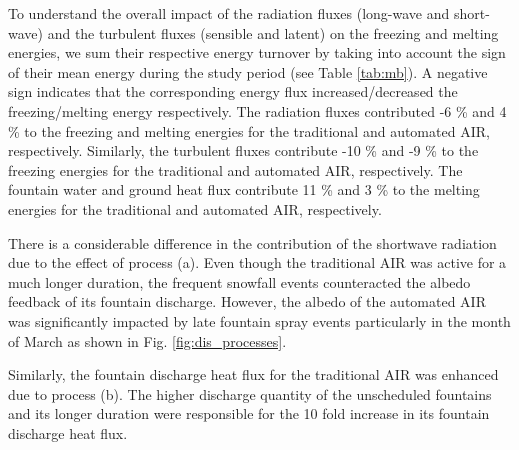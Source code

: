 \documentclass[tc, manuscript]{copernicus}
\begin{document}
To understand the overall impact of the radiation fluxes (long-wave and short-wave) and the turbulent fluxes
(sensible and latent) on the freezing and melting energies, we sum their respective energy turnover by taking
into account the sign of their mean energy during the study period (see Table \ref{tab:mb}). A negative sign
indicates that the corresponding energy flux increased/decreased the freezing/melting energy respectively.  The
radiation fluxes contributed -6 \% and 4 \% to the freezing and melting energies for the traditional and
automated AIR, respectively.  Similarly, the turbulent fluxes contribute -10 \% and -9 \% to the freezing
energies for the traditional and automated AIR, respectively. The fountain water and ground heat flux contribute
11 \% and 3 \% to the melting energies for the traditional and automated AIR, respectively. 

There is a considerable difference in the contribution of the shortwave radiation due to the effect of process
(a). Even though the traditional AIR was active for a much longer duration, the frequent snowfall events
counteracted the albedo feedback of its fountain discharge. However, the albedo of the automated AIR was
significantly impacted by late fountain spray events particularly in the month of March as shown in Fig.
\ref{fig:dis_processes}.

Similarly, the fountain discharge heat flux for the traditional AIR was enhanced due to process (b). The higher
discharge quantity of the unscheduled fountains and its longer duration were responsible for the 10 fold
increase in its fountain discharge heat flux.
\end{document}
